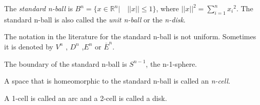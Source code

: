 \documentclass[12pt]{article}
\begin{document}
The \emph{standard n-ball} is $B^n = \{x \in \mathbb{R}^n | \quad ||x|| \le 1 \}$,
where $||x||^2 = \sum_{i=1}^n {x_i}^2 $.
The standard n-ball is also called the \emph{unit n-ball} or the
\emph{n-disk}.

The notation in the literature for the standard n-ball is not uniform.
Sometimes it is denoted by $V^n$ , $D^n$ ,$E^n$ or ${\overline{E}}^n$.

The boundary of the standard n-ball is $S^{n-1}$, the n-1-sphere.

A space that is homeomorphic to the standard n-ball is called
an \emph{n-cell}.

A 1-cell is called an arc and a 2-cell is called a disk.
\end{document}

